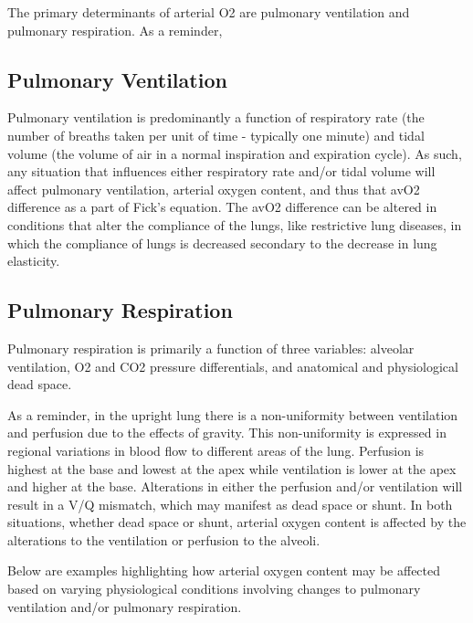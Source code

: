 {\begin{itemize}
The primary determinants of arterial O2 are pulmonary ventilation and pulmonary respiration. As a reminder, 

\subsection{Pulmonary Ventilation}
Pulmonary ventilation is predominantly a function of respiratory rate (the number of breaths taken per unit of time - typically one minute) and tidal volume (the volume of air in a normal inspiration and expiration cycle). As such, any situation that influences either respiratory rate and/or tidal volume will affect pulmonary ventilation, arterial oxygen content, and thus that avO2 difference as a part of Fick's equation. The avO2 difference can be altered in conditions that alter the compliance of the lungs, like restrictive lung diseases, in which the compliance of lungs is decreased secondary to the decrease in lung elasticity. 

\subsection{Pulmonary Respiration}
Pulmonary respiration is primarily a function of three variables: alveolar ventilation, O2 and CO2 pressure differentials, and anatomical and physiological dead space. 

As a reminder, in the upright lung there is a non-uniformity between ventilation and perfusion due to the effects of gravity. This non-uniformity is expressed in regional variations in blood flow to different areas of the lung. Perfusion is highest at the base and lowest at the apex while ventilation is lower at the apex and higher at the base. Alterations in either the perfusion and/or ventilation will result in a V/Q mismatch, which may manifest as dead space or shunt. In both situations, whether dead space or shunt, arterial oxygen content is affected by the alterations to the ventilation or perfusion to the alveoli. 

Below are examples highlighting how arterial oxygen content may be affected based on varying physiological conditions involving changes to  pulmonary ventilation and/or pulmonary respiration.  


\end{itemize}}
